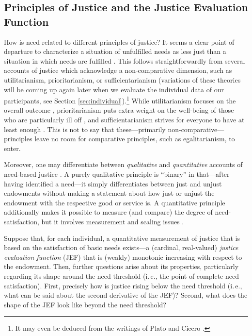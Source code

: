 \documentclass[12pt]{scrartcl}
\begin{document}
\subsection{Principles of Justice and the Justice Evaluation Function}\label{sec:principles}
How is need related to different principles of justice?
It seems a clear point of departure to characterize a situation of unfulfilled needs as less just than a situation in which needs are fulfilled \citep{kipnis_economic_1985}.
This follows straightforwardly from several accounts of justice which acknowledge a non-comparative dimension, such as utilitarianism, prioritarianism, or sufficientarianism (variations of these theories will be coming up again later when we evaluate the individual data of our participants, see Section \ref{sec:individual}).\footnote{It may even be deduced from the writings of Plato and Cicero \citep[see][]{siebel_each_2017}.}
While utilitarianism focuses on the overall outcome \citep[e.\,g.,][]{bentham_introduction_2009,mill_utilitarianism_1998}, prioritarianism puts extra weight on the well-being of those who are particularly ill off \citep[e.\,g.,][]{parfit_equality_1997}, and sufficientarianism strives for everyone to have at least enough \citep[e.\,g.,][]{frankfurt_equality_1987,crisp_egalitarianism_2003,schramme_is_2006}.
This is not to say that these---primarily non-comparative---principles leave no room for comparative principles, such as egalitarianism, to enter.

Moreover, one may differentiate between \textit{qualitative} and \textit{quantitative} accounts of need-based justice \citep[see][]{siebel_need_2020}.
A purely qualitative principle is ``binary'' in that---after having identified a need---it simply differentiates between just and unjust endowments without making a statement about how just or unjust the endowment with the respective good or service is.
A quantitative principle additionally makes it possible to measure (and compare) the degree of need-satisfaction, but it involves measurement and scaling issues \citep[see][]{diederich_identifying_2020}.

Suppose that, for each individual, a quantitative measurement of justice that is based on the satisfaction of basic needs exists---a (cardinal, real-valued) \textit{justice evaluation function} (JEF) that is (weakly) monotonic increasing with respect to the endowment. Then, further questions arise about its properties, particularly regarding its shape around the need threshold (i.\,e., the point of complete need satisfaction).
First, precisely how is justice rising below the need threshold (i.\,e., what can be said about the second derivative of the JEF)?
Second, what does the shape of the JEF look like beyond the need threshold?
\end{document}
